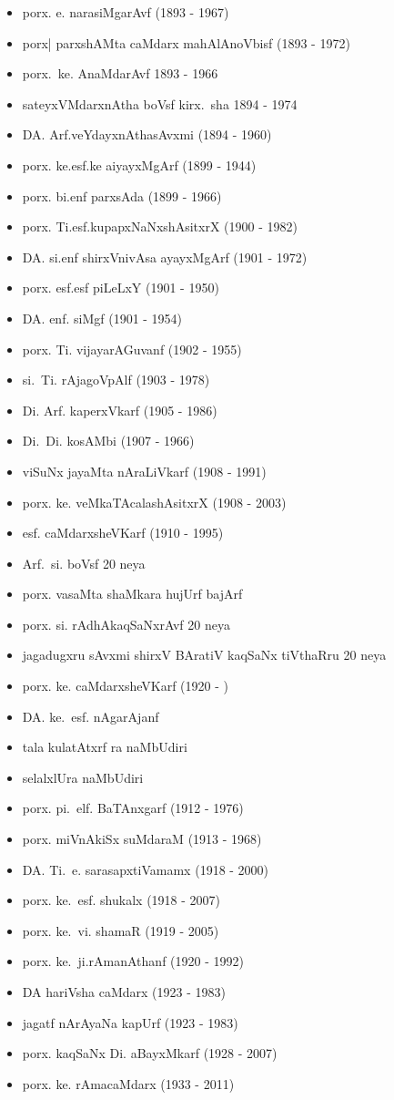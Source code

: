 {\begin{itemize}
\item porx. e. narasiMgarAvf {\rm (1893 - 1967)}
\item porx| parxshAMta caMdarx mahAlAnoVbisf {\rm (1893 - 1972)}
\item porx.~ke. AnaMdarAvf {\rm 1893 - 1966}
\item sateyxVMdarxnAtha boVsf kirx.~sha {\rm 1894 - 1974}
\item DA. Arf.veYdayxnAthasAvxmi {\rm (1894 - 1960)}
\item porx. ke.esf.ke aiyayxMgArf {\rm (1899 - 1944)}
\item porx. bi.enf parxsAda {\rm (1899 - 1966)}
\item porx. Ti.esf.kupapxNaNxshAsitxrX {\rm (1900 - 1982)}
\item DA. si.enf shirxVnivAsa ayayxMgArf {\rm (1901 - 1972)}
\item porx. esf.esf piLeLxY {\rm (1901 - 1950)}
\item DA. enf. siMgf {\rm (1901 - 1954)}
\item porx. Ti. vijayarAGuvanf {\rm (1902 - 1955)}
\item si.~Ti. rAjagoVpAlf {\rm (1903 - 1978)}
\item Di. Arf. kaperxVkarf {\rm (1905 - 1986)}
\item Di.~Di. kosAMbi {\rm (1907 - 1966)}
\item viSuNx jayaMta nAraLiVkarf {\rm (1908 - 1991)}
\item porx. ke. veMkaTAcalashAsitxrX {\rm (1908 - 2003)}
\item esf. caMdarxsheVKarf {\rm (1910 - 1995)}
\item Arf.~si. boVsf {\rm 20} neya 
\item porx. vasaMta shaMkara hujUrf bajArf
\item porx. si. rAdhAkaqSaNxrAvf {\rm 20} neya
\item jagadugxru sAvxmi shirxV BAratiV kaqSaNx tiVthaRru {\rm 20} neya
\item porx. ke. caMdarxsheVKarf {\rm (1920 - )}
\item DA. ke.~esf. nAgarAjanf
\item tala kulatAtxrf ra naMbUdiri
\item selalxlUra naMbUdiri
\item porx. pi.~elf. BaTAnxgarf {\rm (1912 - 1976)}
\item porx. miVnAkiSx suMdaraM {\rm (1913 - 1968)}
\item DA. Ti.~e. sarasapxtiVamamx {\rm (1918 - 2000)}
\item porx. ke.~esf. shukalx {\rm (1918 - 2007)}
\item porx. ke.~vi. shamaR {\rm (1919 - 2005)}
\item porx. ke.~ji.rAmanAthanf {\rm (1920 - 1992)}
\item DA hariVsha caMdarx {\rm (1923 - 1983)}
\item jagatf nArAyaNa kapUrf {\rm (1923 - 1983)}
\item porx. kaqSaNx Di. aBayxMkarf {\rm (1928 - 2007)}
\item porx. ke. rAmacaMdarx {\rm (1933 - 2011)}
\end{itemize}}


